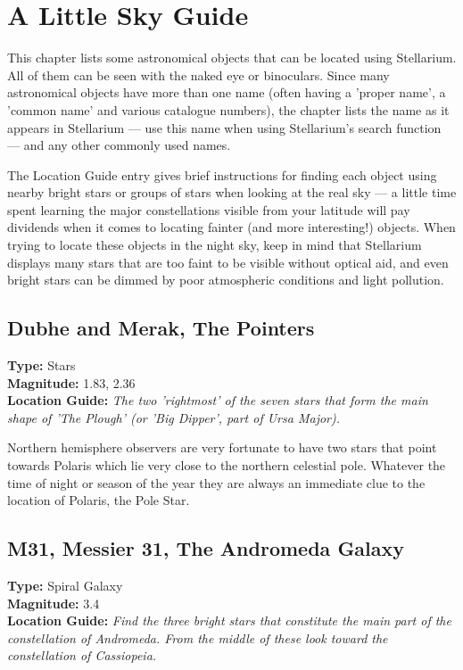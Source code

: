 
\chapter{A Little Sky Guide}
\label{ch:SkyGuide}

This chapter lists some astronomical objects that can be located using
Stellarium. All of them can be seen with the naked eye or binoculars.
Since many astronomical objects have more than one name (often having a
'proper name', a 'common name' and various catalogue numbers), the chapter
lists the name as it appears in Stellarium --- use this name when using
Stellarium's search function --- and any other commonly used names.

The Location Guide entry gives brief instructions for finding each
object using nearby bright stars or groups of stars when looking at the
real sky --- a little time spent learning the major constellations
visible from your latitude will pay dividends when it comes to locating
fainter (and more interesting!) objects. When trying to locate these
objects in the night sky, keep in mind that Stellarium displays many
stars that are too faint to be visible without optical aid, and even
bright stars can be dimmed by poor atmospheric conditions and light
pollution.

\section{Dubhe and Merak, The Pointers}
\textbf{Type:} Stars \\
\textbf{Magnitude:} 1.83, 2.36 \\
\textbf{Location Guide:} \textit{The two 'rightmost' of the seven stars that form the main shape of 'The Plough' (or 'Big Dipper', part of Ursa Major).} 

Northern hemisphere observers are very fortunate to have two stars
that point towards Polaris which lie very close to the northern
celestial pole. Whatever the time of night or season of the year they
are always an immediate clue to the location of Polaris, the Pole
Star.

\section{M31, Messier 31, The Andromeda Galaxy}
\textbf{Type:} Spiral Galaxy \\
\textbf{Magnitude:} 3.4 \\ 
\textbf{Location Guide:} \textit{Find the three bright stars that constitute the main part of the constellation of Andromeda. From the middle of these look toward the constellation of Cassiopeia.}

